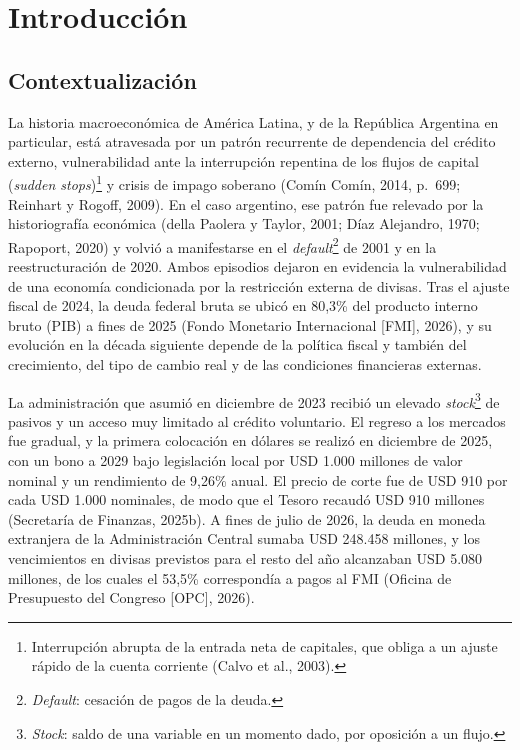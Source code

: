 \chapter{Introducción}

\section{Contextualización}

La historia macroeconómica de América Latina, y de la República
Argentina en particular, está atravesada por un patrón recurrente de
dependencia del crédito externo, vulnerabilidad ante la interrupción
repentina de los flujos de capital (\emph{sudden stops})\footnote{Interrupción
  abrupta de la entrada neta de capitales, que obliga a un ajuste rápido
  de la cuenta corriente (Calvo et al., 2003).} y crisis de impago
soberano (Comín Comín, 2014, p.~699; Reinhart y Rogoff, 2009). En el
caso argentino, ese patrón fue relevado por la historiografía económica
(della Paolera y Taylor, 2001; Díaz Alejandro, 1970; Rapoport, 2020) y
volvió a manifestarse en el \emph{default}\footnote{\emph{Default}:
  cesación de pagos de la deuda.} de 2001 y en la reestructuración de
2020. Ambos episodios dejaron en evidencia la vulnerabilidad de una
economía condicionada por la restricción externa de divisas. Tras el
ajuste fiscal de 2024, la deuda federal bruta se ubicó en 80,3\% del
producto interno bruto (PIB) a fines de 2025 (Fondo Monetario
Internacional {[}FMI{]}, 2026), y su evolución en la década siguiente
depende de la política fiscal y también del crecimiento, del tipo de
cambio real y de las condiciones financieras externas.

La administración que asumió en diciembre de 2023 recibió un elevado
\emph{stock}\footnote{\emph{Stock}: saldo de una variable en un momento
  dado, por oposición a un flujo.} de pasivos y un acceso muy limitado
al crédito voluntario. El regreso a los mercados fue gradual, y la
primera colocación en dólares se realizó en diciembre de 2025, con un
bono a 2029 bajo legislación local por USD 1.000 millones de valor
nominal y un rendimiento de 9,26\% anual. El precio de corte fue de USD
910 por cada USD 1.000 nominales, de modo que el Tesoro recaudó USD 910
millones (Secretaría de Finanzas, 2025b). A fines de julio de 2026, la
deuda en moneda extranjera de la Administración Central sumaba USD
248.458 millones, y los vencimientos en divisas previstos para el resto
del año alcanzaban USD 5.080 millones, de los cuales el 53,5\%
correspondía a pagos al FMI (Oficina de Presupuesto del Congreso
{[}OPC{]}, 2026).

